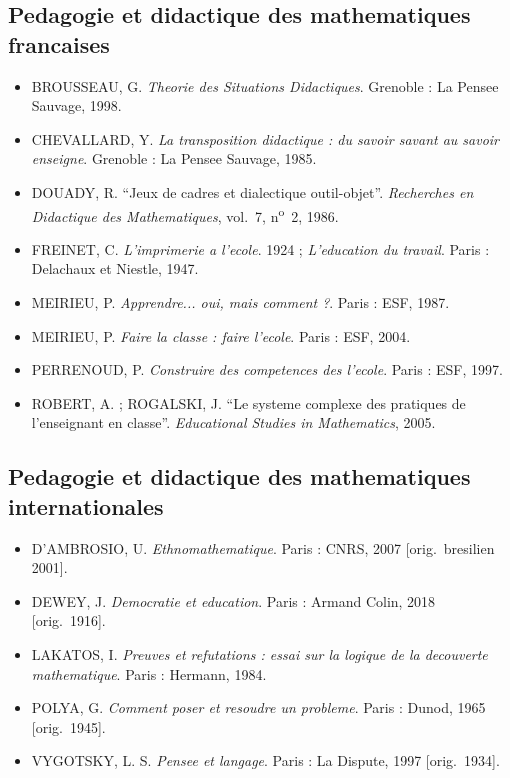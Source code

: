 \documentclass[12pt,a4paper]{scrartcl}
\begin{document}
\subsection{Pedagogie et didactique des mathematiques francaises}
\begin{itemize}[leftmargin=1.3em,itemsep=0.15em,topsep=0.3em]
  \item BROUSSEAU, G. \emph{Theorie des Situations Didactiques}. Grenoble : La Pensee Sauvage, 1998.
  \item CHEVALLARD, Y. \emph{La transposition didactique : du savoir savant au savoir enseigne}. Grenoble : La Pensee Sauvage, 1985.
  \item DOUADY, R. \enquote{Jeux de cadres et dialectique outil-objet}. \emph{Recherches en Didactique des Mathematiques}, vol.~7, n\textsuperscript{o}~2, 1986.
  \item FREINET, C. \emph{L'imprimerie a l'ecole}. 1924 ; \emph{L'education du travail}. Paris : Delachaux et Niestle, 1947.
  \item MEIRIEU, P. \emph{Apprendre... oui, mais comment ?}. Paris : ESF, 1987.
  \item MEIRIEU, P. \emph{Faire la classe : faire l'ecole}. Paris : ESF, 2004.
  \item PERRENOUD, P. \emph{Construire des competences des l'ecole}. Paris : ESF, 1997.
  \item ROBERT, A. ; ROGALSKI, J. \enquote{Le systeme complexe des pratiques de l'enseignant en classe}. \emph{Educational Studies in Mathematics}, 2005.
\end{itemize}

\subsection{Pedagogie et didactique des mathematiques internationales}
\begin{itemize}[leftmargin=1.3em,itemsep=0.15em,topsep=0.3em]
  \item D'AMBROSIO, U. \emph{Ethnomathematique}. Paris : CNRS, 2007 [orig.~bresilien 2001].
  \item DEWEY, J. \emph{Democratie et education}. Paris : Armand Colin, 2018 [orig.~1916].
  \item LAKATOS, I. \emph{Preuves et refutations : essai sur la logique de la decouverte mathematique}. Paris : Hermann, 1984.
  \item POLYA, G. \emph{Comment poser et resoudre un probleme}. Paris : Dunod, 1965 [orig.~1945].
  \item VYGOTSKY, L. S. \emph{Pensee et langage}. Paris : La Dispute, 1997 [orig.~1934].
\end{itemize}
\end{document}
